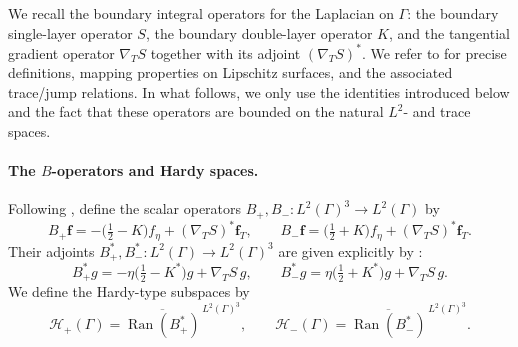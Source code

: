 \documentclass[a4paper, 11pt]{article}
\newcommand{\f}{\mathbf{f}}
\begin{document}
We recall the boundary integral operators for the Laplacian on $\Gamma$: the boundary single-layer  operator $S$, the boundary double-layer operator $K$, and the tangential gradient operator $\nabla_T S$ together with its adjoint $(\nabla_T S)^\ast$. We refer to \cite{BGK} for precise definitions, mapping properties on Lipschitz surfaces, and the associated trace/jump relations. In what follows, we only use the identities introduced below and the fact that these operators are bounded on the natural $L^2$- and trace spaces.

\paragraph{The $B$-operators and Hardy spaces.}
Following \cite[Defs.~3.2 and 3.15]{BGK}, define the scalar operators $B_+,B_-:L^2(\Gamma)^3\to L^2(\Gamma)$ by
\begin{equation}\label{eq:Bi_Bo}
B_+ \f = -\Big(\tfrac12 - K\Big)f_\eta + (\nabla_T S)^\ast\f_T,
\qquad
B_- \f = \Big(\tfrac12 + K\Big)f_\eta + (\nabla_T S)^\ast\f_T.
\end{equation}
Their adjoints $B_+^\ast,B_-^\ast:L^2(\Gamma)\to L^2(\Gamma)^3$ are given explicitly by
\cite[Lemmas~3.5 and 3.18]{BGK}:
\begin{equation}\label{eq:BiBo_adj}
B_+^\ast g = -\eta\Big(\tfrac12 - K^\ast\Big)g + \nabla_T S\, g,
\qquad
B_-^\ast g = \eta\Big(\tfrac12 + K^\ast\Big)g + \nabla_T S\, g.
\end{equation}
We define the Hardy-type subspaces by
\begin{equation}\label{eq:Hpm_def}
\mathcal H_+ (\Gamma)= \overline{\operatorname{Ran}(B_+^\ast)}^{\,L^2(\Gamma)^3},
\qquad
\mathcal H_- (\Gamma)= \overline{\operatorname{Ran}(B_-^\ast)}^{\,L^2(\Gamma)^3}.
\end{equation}
\end{document}
